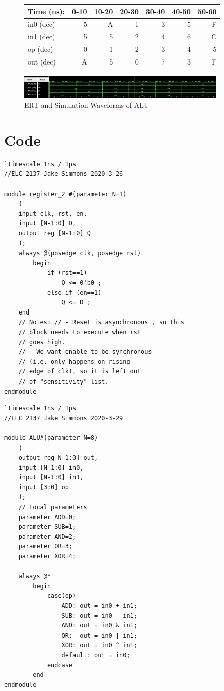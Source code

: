 \documentclass[11pt]{article}
\begin{document}
\begin{figure}[ht]\centering
	\begin{tabular}{l|rrrrrr}
		Time (ns): & 0-10 & 10-20 & 20-30 & 30-40 & 40-50 & 50-60  \\
		\midrule
		in0 (dec) & 5 & A & 1 & 3 & 5 & F \\
		in1 (dec) & 5 & 5 & 2 & 4 & 6 & C \\
		op (dec) & 0 & 1 & 2 & 3 & 4 & 5 \\
		\midrule 
		out (dec) & A & 5 & 0 & 7 & 3 & F \\
		\bottomrule
	\end{tabular}\medskip
	
		\includegraphics[width=0.9\textwidth]{ALU_test.JPG}
		\caption{ERT and Simulation Waveforms of ALU}
		\label{fig:sim_with_table}
\end{figure}


\clearpage
\section*{Code}

\begin{lstlisting}[style=Verilog,
caption=Register Module,
label=code:ex 
]
`timescale 1ns / 1ps
//ELC 2137 Jake Simmons 2020-3-26

module register_2 #(parameter N=1) 
	(
	input clk, rst, en, 
	input [N-1:0] D, 
	output reg [N-1:0] Q 
	);
	always @(posedge clk, posedge rst) 
		begin       
			if (rst==1) 
				Q <= 0'b0 ; 
			else if (en==1) 
				Q <= D ; 
	end
	// Notes: // - Reset is asynchronous , so this 
	// block needs to execute when rst 
	// goes high.
	// - We want enable to be synchronous 
	// (i.e. only happens on rising 
	// edge of clk), so it is left out 
	// of "sensitivity" list.
endmodule

\end{lstlisting}

\begin{lstlisting}[style=Verilog,
caption=ALU Module,
label=code:ex 
]
`timescale 1ns / 1ps
//ELC 2137 Jake Simmons 2020-3-29

module ALU#(parameter N=8) 
	( 
	output reg[N-1:0] out, 
	input [N-1:0] in0, 
	input [N-1:0] in1, 
	input [3:0] op 
	);
	// Local parameters 
	parameter ADD=0; 
	parameter SUB=1; 
	parameter AND=2; 
	parameter OR=3; 
	parameter XOR=4;

	always @* 
		begin 
			case(op) 
				ADD: out = in0 + in1; 
				SUB: out = in0 - in1;
				AND: out = in0 & in1;
				OR:  out = in0 | in1;
				XOR: out = in0 ^ in1;
				default: out = in0; 
			endcase 
		end
endmodule

\end{lstlisting}
\end{document}

